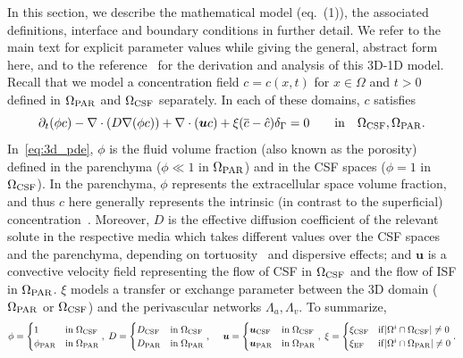 \documentclass[fleqn,10pt]{wlscirep}
\begin{document}
In this section, we describe the mathematical model (eq.~(1)), the
associated definitions, interface and boundary conditions in further
detail. We refer to the main text for explicit parameter values while
giving the general, abstract form here, and to the
reference~\cite{masri2024modelling, laurino2019derivation} for the
derivation and analysis of this 3D-1D model. Recall that we model a
concentration field $c = c(x, t)$ for $x \in \Omega$ and $t > 0$
defined in $\Omega_{\rm PAR}$ and $\Omega_{\rm CSF}$ separately. In
each of these domains, $c$ satisfies
\begin{equation}
  \partial_t (\phi c) - \nabla \cdot (D \nabla (\phi c) ) + \nabla \cdot (\bm u c ) + \xi (\overline{c} - \hat c ) \delta_\Gamma
   = 0
  \quad \quad \mathrm{in} \quad \Omega_{\rm CSF}, \Omega_{\rm{PAR}}.
  \label{eq:3d_pde}
\end{equation}
In~\eqref{eq:3d_pde}, $\phi$ is the fluid volume fraction (also known as the porosity) defined in the parenchyma ($\phi \ll 1$ in $\Omega_{\rm PAR}$) and in the CSF spaces ($\phi = 1$ in $\Omega_{\rm CSF}$). In the parenchyma, $\phi$ represents the extracellular space volume fraction, and thus $c$ here generally represents the intrinsic (in contrast to the superficial) concentration~\cite{sykova2008diffusion}. Moreover, $D$ is the effective diffusion coefficient of the relevant solute in the respective media which takes different values over the CSF spaces and the parenchyma, depending on tortuosity~\cite{sykova2008diffusion} and dispersive effects; and $\bm u$ is a convective velocity field representing the flow of CSF in $\Omega_{\rm CSF}$ and the flow of ISF in $\Omega_{\rm PAR}$. $\xi$ models a transfer or exchange parameter between the 3D domain ($\Omega_{\rm PAR}$ or $\Omega_{\rm CSF}$) and the perivascular networks $\Lambda_a, \Lambda_v$. To summarize,
\begin{equation*}
\phi =  \begin{cases}
  1  & \mathrm{in} \;  \Omega_{\rm{CSF}} \\ 
  \phi_{\rm{PAR}} & \mathrm{in} \; \Omega_{\rm{PAR}} 
  \end{cases}, \; 
D = \begin{cases}
  D_{\rm{CSF}} & \mathrm{in} \;  \Omega_{\rm{CSF}} \\ 
  D_{\rm{PAR}} & \mathrm{in} \; \Omega_{\rm{PAR}} \end{cases}, \; 
  \quad \bm u  = \begin{cases}
  \bm{u}_{\rm{CSF}} & \mathrm{in} \; \Omega_{\rm{CSF}} \\ 
  \bm{u}_{\rm{PAR}} & \mathrm{in} \; \Omega_{\rm{PAR}} 
\end{cases}, \; 
\xi = \begin{cases}
  \xi_{\rm{CSF}} & \mathrm{if} |\Omega^i \cap \Omega_{\rm{CSF}}| \neq 0 \\
  \xi_{\rm{EF}} & \mathrm{if} |\Omega^i \cap \Omega_{\rm{PAR}}| \neq 0  
\end{cases} . 
\end{equation*}
\end{document}
